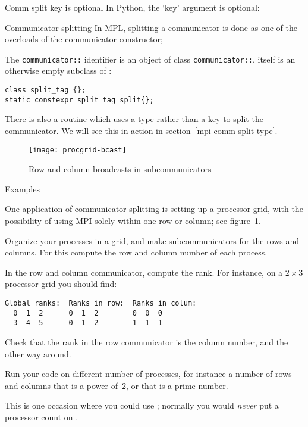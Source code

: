 \begin{pythonnote}{Comm split key is optional}
  In Python, the `key' argument is optional:
\end{pythonnote}

\begin{mplnote}{Communicator splitting}
  \label{mpl::split}
  In \ac{MPL}, splitting a communicator is done as one of the overloads
  of the communicator constructor;

  \begin{mplimpl}
    The \lstinline+communicator::+ identifier
    is an object of class
    \lstinline+communicator::+,
    itself is an otherwise empty
    subclass of :
\begin{lstlisting}
class split_tag {};
static constexpr split_tag split{};
\end{lstlisting}
  \end{mplimpl}
\end{mplnote}


There is also a routine 
which uses a type rather than a key to split the communicator.
We will see this in action in section~\ref{mpi-comm-split-type}.

\begin{figure}[ht]
  \texttt{[image: procgrid-bcast]}
  \caption{Row and column broadcasts in subcommunicators}
  \label{fig:procgrid-bcast}
\end{figure}

 {Examples}

One application of communicator splitting is setting up a processor
grid, with the possibility of using MPI solely within one row or
column; see figure~\ref{fig:procgrid-bcast}.

\begin{exercise}
  \label{ex:rowcolcomm}
  Organize your processes in a grid, and make subcommunicators for
  the rows and columns. For this compute the row and column number of
  each process.

  In the row and column communicator, compute the rank. For instance,
  on a $2\times3$ processor grid you should find:
\begin{verbatim}
Global ranks:  Ranks in row:  Ranks in colum:
  0  1  2      0  1  2        0  0  0
  3  4  5      0  1  2        1  1  1
\end{verbatim}

  Check that the rank in the row communicator is the column number,
  and the other way around.

  Run your code on different number of processes, for instance a
  number of rows and columns that is a power of~2, or that is a prime number.
\begin{tacc}
    This is one occasion where you could use ;
    normally you would \emph{never} put a processor count on .
\end{tacc}
\end{exercise}

